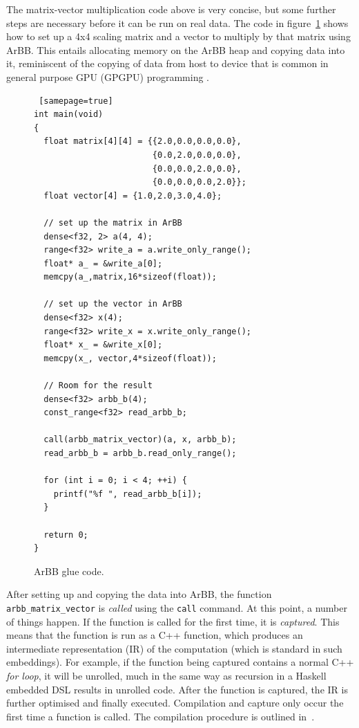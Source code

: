 The matrix-vector multiplication code above is very concise, but some further
steps are necessary before it can be run on real data. The code 
in figure~\ref{fig:EMB_ARBBFIG} shows how to set up a 4x4 scaling matrix and a vector to 
multiply by that matrix using ArBB. This entails allocating 
memory on the ArBB heap and copying data into it, reminiscent of the copying of
data from
host to 
device that is common in general purpose GPU (GPGPU) programming . 
\begin{figure}
\begin{small}
\begin{Verbatim} [samepage=true] 
int main(void)
{
  float matrix[4][4] = {{2.0,0.0,0.0,0.0},
                        {0.0,2.0,0.0,0.0},
                        {0.0,0.0,2.0,0.0},
                        {0.0,0.0,0.0,2.0}};
  float vector[4] = {1.0,2.0,3.0,4.0}; 

  // set up the matrix in ArBB 
  dense<f32, 2> a(4, 4);
  range<f32> write_a = a.write_only_range();
  float* a_ = &write_a[0];
  memcpy(a_,matrix,16*sizeof(float));

  // set up the vector in ArBB 
  dense<f32> x(4);
  range<f32> write_x = x.write_only_range();
  float* x_ = &write_x[0];
  memcpy(x_, vector,4*sizeof(float));

  // Room for the result
  dense<f32> arbb_b(4);
  const_range<f32> read_arbb_b;

  call(arbb_matrix_vector)(a, x, arbb_b);
  read_arbb_b = arbb_b.read_only_range();

  for (int i = 0; i < 4; ++i) {
    printf("%f ", read_arbb_b[i]);
  }
 
  return 0;
}
\end{Verbatim}
\end{small}

\caption{ArBB glue code.}
\label{fig:EMB_ARBBFIG}

\end{figure}

After setting up and copying the data into ArBB, the function {\tt arbb\_matrix\_vector} 
is {\em called} using the {\tt call} command. At this point, a number of
things happen. If the function is called for the first time, it is 
{\em captured}. This means that the function is run as a C++ function, which produces 
an intermediate representation (IR) of the computation (which is standard in such embeddings).
For example, if the function being captured contains a normal C++ {\em for loop}, it will be unrolled, much in the same way as recursion in a
Haskell embedded DSL results in unrolled code. After the function is captured, 
the IR is further optimised and finally executed. Compilation and capture 
only occur the first time a function is called. The compilation procedure
is outlined in~.

